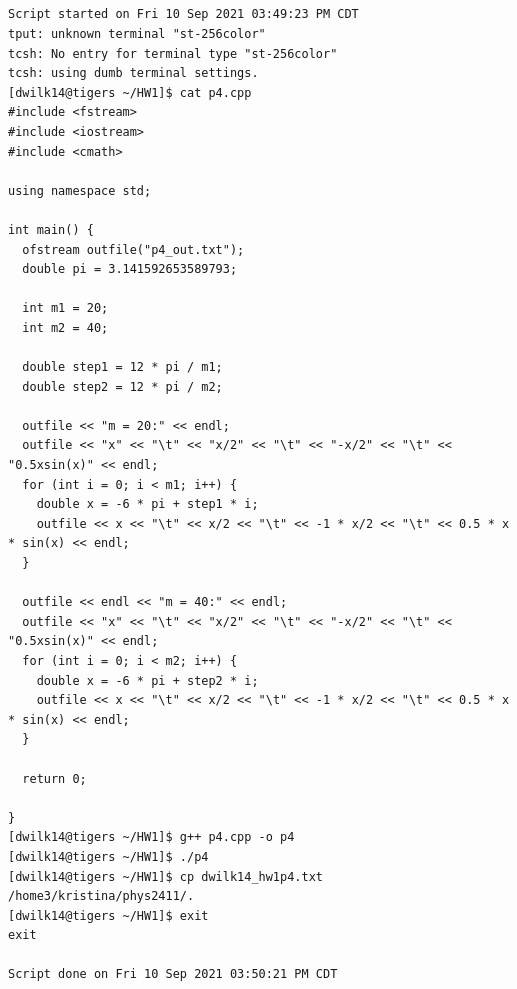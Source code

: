 \documentclass{article}
\begin{document}
\subsection{}
\begin{verbatim}
Script started on Fri 10 Sep 2021 03:49:23 PM CDT
tput: unknown terminal "st-256color"
tcsh: No entry for terminal type "st-256color"
tcsh: using dumb terminal settings.
[dwilk14@tigers ~/HW1]$ cat p4.cpp
#include <fstream>
#include <iostream>
#include <cmath>

using namespace std;

int main() {
  ofstream outfile("p4_out.txt");
  double pi = 3.141592653589793;

  int m1 = 20;
  int m2 = 40;

  double step1 = 12 * pi / m1;
  double step2 = 12 * pi / m2;

  outfile << "m = 20:" << endl;
  outfile << "x" << "\t" << "x/2" << "\t" << "-x/2" << "\t" << "0.5xsin(x)" << endl;
  for (int i = 0; i < m1; i++) {
    double x = -6 * pi + step1 * i;
    outfile << x << "\t" << x/2 << "\t" << -1 * x/2 << "\t" << 0.5 * x * sin(x) << endl;
  }

  outfile << endl << "m = 40:" << endl;
  outfile << "x" << "\t" << "x/2" << "\t" << "-x/2" << "\t" << "0.5xsin(x)" << endl;
  for (int i = 0; i < m2; i++) {
    double x = -6 * pi + step2 * i;
    outfile << x << "\t" << x/2 << "\t" << -1 * x/2 << "\t" << 0.5 * x * sin(x) << endl;
  }

  return 0;

}
[dwilk14@tigers ~/HW1]$ g++ p4.cpp -o p4
[dwilk14@tigers ~/HW1]$ ./p4
[dwilk14@tigers ~/HW1]$ cp dwilk14_hw1p4.txt /home3/kristina/phys2411/.
[dwilk14@tigers ~/HW1]$ exit
exit

Script done on Fri 10 Sep 2021 03:50:21 PM CDT
\end{verbatim}
\end{document}
